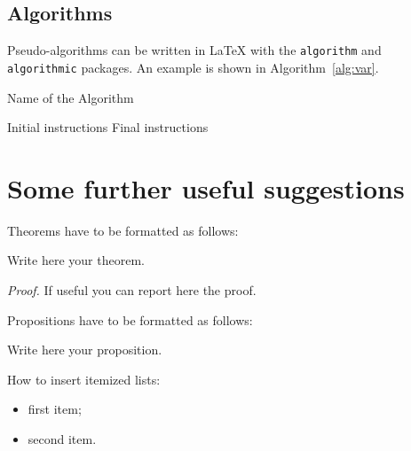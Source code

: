 \documentclass[11pt,a4paper]{article}
\begin{document}
    \subsection{Algorithms} \label{subsec:algorithms}

        Pseudo-algorithms can be written in \LaTeX{} with the \texttt{algorithm} and \texttt{algorithmic} packages. An example is shown in Algorithm~\ref{alg:var}.

        \begin{algorithm}[H]
            \label{alg:example}
            \caption{Name of the Algorithm}
            \label{alg:var}
            \label{protocol1}
            \begin{algorithmic}[1]
                \STATE Initial instructions
                    \ENDIF
                \ENDFOR
                \ENDWHILE
                \STATE Final instructions
            \end{algorithmic}
        \end{algorithm} 

\section{Some further useful suggestions}

    Theorems have to be formatted as follows:

    \begin{theorem} \label{a_theorem}
        Write here your theorem. 
    \end{theorem}
    \textit{Proof.} If useful you can report here the proof.
    \vspace{0.3cm} %

    Propositions have to be formatted as follows:

    \begin{proposition}
        Write here your proposition.
    \end{proposition}
    \vspace{0.3cm} %

    How to insert itemized lists:

    \begin{itemize}
        \item first item;
        \item second item.
    \end{itemize}
\end{document}
